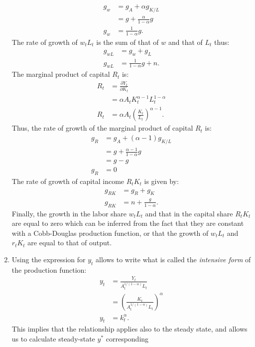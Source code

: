\documentclass[]{book}
\theoremstyle{definition}
\theoremstyle{definition}
\theoremstyle{definition}
\theoremstyle{remark}
\begin{document}
\begin{enumerate}
\[  \begin{aligned}
  g_w&=g_A+\alpha g_{K/L}\\
  &=g+\frac{\alpha}{1-\alpha}g\\
  g_w&=\frac{1}{1-\alpha}g.
  \end{aligned}
  \] The rate of growth of \(w_t L_t\) is the sum of that of \(w\) and
  that of \(L_t\) thus: \[
  \begin{aligned}
  g_{wL}&=g_w + g_L \\
  g_{wL}&=\frac{1}{1-\alpha}g+n.
  \end{aligned}
  \] The marginal product of capital \(R_t\) is: \[
  \begin{aligned}
  R_t&=\frac{\partial Y_t}{\partial K_t}\\
  &=\alpha A_t K_t^{\alpha-1}L_t^{1-\alpha}\\
  R_t&= \alpha A_t \left(\frac{K_t}{L_t}\right)^{\alpha-1}.
  \end{aligned}
  \] Thus, the rate of growth of the marginal product of capital \(R_t\)
  is: \[
  \begin{aligned}
  g_R&=g_A+(\alpha-1) g_{K/L}\\
  &=g +\frac{\alpha-1}{1-\alpha}g\\
  &=g-g\\
  g_R&=0
  \end{aligned}
  \] The rate of growth of capital income \(R_t K_t\) is given by: \[
  \begin{aligned}
  g_{R K}&=g_R + g_K \\
  g_{R K}&= n + \frac{g}{1-\alpha}.
  \end{aligned}
  \] Finally, the growth in the labor share \(w_t L_t\) and that in the
  capital share \(R_t K_t\) are equal to zero which can be inferred from
  the fact that they are constant with a Cobb-Douglas production
  function, or that the growth of \(w_t L_t\) and \(r_t K_t\) are equal
  to that of output.
\item
  Using the expression for \(y_t\) allows to write what is called the
  \emph{intensive form} of the production function: \[
  \begin{aligned}
  y_t&=\frac{Y_t}{A_t^{1/(1-\alpha)} L_t}\\
  &= \left(\frac{K_t}{A_t^{1/(1-\alpha)}L_t}\right)^\alpha\\
  y_t&= k_t^\alpha.
  \end{aligned}
  \] This implies that the relationship applies also to the steady
  state, and allows us to calculate steady-state \(y^{*}\) corresponding

\end{enumerate}
\end{document}
